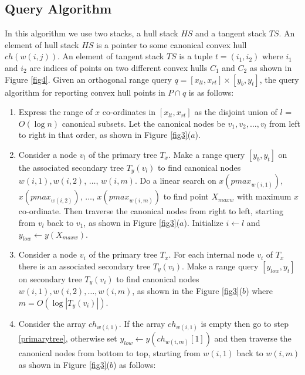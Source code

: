 \documentclass[runningheads,a4paper]{llncs}
\begin{document}
\subsection{Query Algorithm}\label{query-al}In this algorithm we use two stacks, a hull stack $HS$ and a tangent stack $TS$. An element of hull stack
$HS$ is a pointer to some canonical convex hull $ch(w(i,j))$. An element of tangent stack $TS$ is a tuple
$t=(i_{1},i_{2})$ where $i_{1}$ and $i_{2}$ are indices of points on two different convex hulls $C_{1}$ and
$C_{2}$ as shown in Figure \ref{fig4}.
Given an orthogonal range query $q = [x_{lt}, x_{rt}] \times [y_{b}, y_{t}]$, the query algorithm
for reporting convex hull points in $P \cap q$ is as follows:
\begin{enumerate}
\item 
Express the range of $x$ co-ordinates in $[x_{lt}, x_{rt}]$ as the
disjoint union of $l$ = $O(\log n)$ canonical subsets. Let the canonical
nodes be $ v_{1}, v_{2},\ldots, v_{l} $ from left to right in that order, as
shown in Figure \ref{fig3}($a$).

\item\label{intial-step} Consider a node $v_{l}$ of the primary tree
  $T_{x}$. Make a range query $[y_{b}, y_{t}]$ on the associated secondary
  tree $T_{y}(v_{l})$ to find canonical nodes $ w(i,1), w(i,2)$, $\ldots$,
  $w(i,m)$. Do a linear search on $x(pmax_{w(i,1)})$, $x(pmax_{w(i,2)})$,
  $\ldots$, $x(pmax_{w(i,m)})$ to find point $X_{maxw}$ with maximum $x$
  co-ordinate. Then traverse the canonical nodes from right to left, starting
  from $v_{l}$ back to $v_{1}$, as shown in Figure \ref{fig3}($a$).
Initialize $i\leftarrow l$ and $y_{low} \leftarrow y(X_{maxw})$.

\item\label{repeat-step}
Consider a node $v_{i}$ of the primary tree
  $T_{x}$. For each internal node $v_{i}$ of $T_{x}$ there is an associated
  secondary tree $T_{y}(v_{i})$. Make a range query $[y_{low}, y_{t}]$ on
  secondary tree $T_{y}(v_{i})$ to find canonical nodes $ w(i,1),
  w(i,2),\ldots, w(i,m)$, as shown in the Figure \ref{fig3}($b$) where
  $m = O(\log |T_{y}(v_{i})|)$.

\item\label{secondtree}
Consider the array $ch_{w(i,1)}$. If  the array $ch_{w(i,1)}$ is empty then go to step \ref{primarytree},
otherwise set $y_{low} \leftarrow y(ch_{w(i,m)}[1])$ and then traverse the canonical nodes from bottom to top,
starting from $w(i,1)$ back to $w(i,m)$ as shown in Figure \ref{fig3}($b$) as follows:\\


\end{enumerate}
\end{document}
